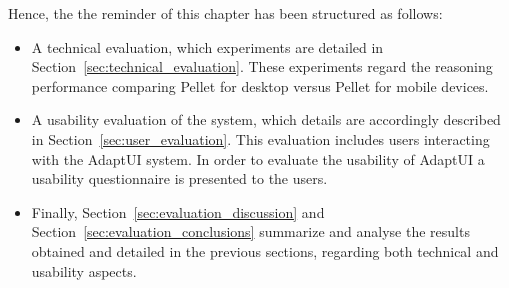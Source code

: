 Hence, the the reminder of this chapter has been structured as follows: 

\begin{itemize}
  \item A technical evaluation, which experiments are detailed in 
  Section~\ref{sec:technical_evaluation}. These experiments regard the 
  reasoning performance comparing Pellet for desktop versus Pellet for mobile 
  devices. 
  
  \item A usability evaluation of the system, which details are accordingly 
  described in Section~\ref{sec:user_evaluation}. This evaluation includes 
  users interacting with the AdaptUI system. In order to evaluate the usability 
  of AdaptUI a usability questionnaire is presented to the users.

  \item Finally, Section~\ref{sec:evaluation_discussion} and 
  Section~\ref{sec:evaluation_conclusions} summarize and analyse the results
  obtained and detailed in the previous sections, regarding both technical and
  usability aspects.
\end{itemize}




%

% 

